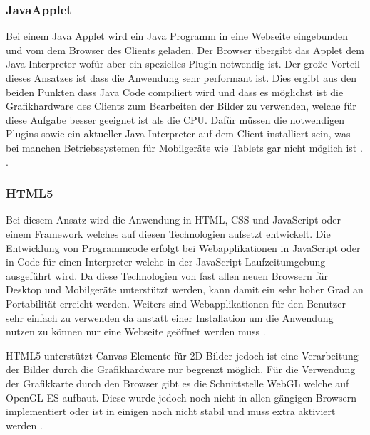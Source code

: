 \subsubsection{JavaApplet}
\label{sec:JavaApplet}
Bei einem Java Applet \cite{japp} wird ein Java Programm in eine Webseite eingebunden und vom dem Browser des Clients geladen.
Der Browser übergibt das Applet dem Java Interpreter wofür aber ein spezielles Plugin notwendig ist. 
%
Der große Vorteil dieses Ansatzes ist dass die Anwendung sehr performant ist.
Dies ergibt aus den beiden Punkten dass Java Code compiliert wird und dass es möglichst ist die Grafikhardware des Clients zum Bearbeiten der Bilder zu verwenden,
welche für diese Aufgabe besser geeignet ist als die CPU.
%
Dafür müssen die notwendigen Plugins sowie ein aktueller Java Interpreter auf dem Client installiert sein, 
was bei manchen Betriebssystemen für Mobilgeräte wie Tablets gar nicht möglich ist \cite{japp}. 
.


\subsubsection{HTML5}
\label{sec:HTML5}
Bei diesem Ansatz wird die Anwendung in HTML, CSS und JavaScript oder einem Framework welches auf diesen Technologien aufsetzt entwickelt.
Die Entwicklung von Programmcode erfolgt bei Webapplikationen in JavaScript oder in Code für einen Interpreter welche in der JavaScript Laufzeitumgebung ausgeführt wird.
Da diese Technologien von fast allen neuen Browsern für Desktop und Mobilgeräte unterstützt werden, kann damit ein sehr hoher Grad an Portabilität erreicht werden.
Weiters sind Webapplikationen für den Benutzer sehr einfach zu verwenden da anstatt einer Installation um die Anwendung nutzen zu können nur eine Webseite geöffnet werden muss \cite{html}.

HTML5 \cite{html} unterstützt Canvas Elemente für 2D Bilder jedoch ist eine Verarbeitung der Bilder durch die Grafikhardware nur begrenzt möglich.
Für die Verwendung der Grafikkarte durch den Browser gibt es die Schnittstelle WebGL \cite{webgl-14} welche auf OpenGL ES \cite{opengl-es-sepc} aufbaut.
Diese wurde jedoch noch nicht in allen gängigen Browsern implementiert oder ist in einigen noch nicht stabil und muss extra aktiviert werden \cite{webgl-14}.


